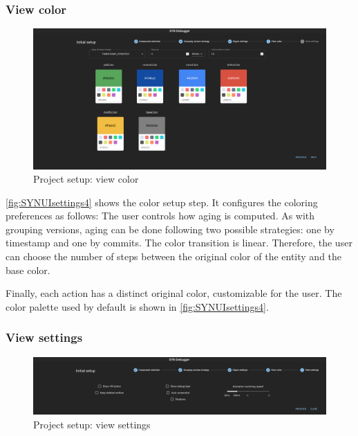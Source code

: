 \subsubsection*{View color}

\begin{figure}[h]
    \center
    \includegraphics[width=\textwidth]{SYNUI-settings4.png}
    \caption{Project setup: view color}
    \label{fig:SYNUIsettings4}
\end{figure}

\autoref{fig:SYNUIsettings4} shows the color setup step. It configures the coloring preferences as follows:
The user controls how aging is computed. 
As with grouping versions, aging can be done following two possible strategies: one by timestamp and one by commits. 
The color transition is linear. Therefore, the user can choose the number of steps between the original color of the entity and the base color. 

Finally, each action has a distinct original color, customizable for the user. The color palette used by default is shown in \autoref{fig:SYNUIsettings4}.



\subsubsection*{View settings}

\begin{figure}[h]
    \center
    \includegraphics[width=\textwidth]{SYNUI-settings5.png}
    \caption{Project setup: view settings}
    \label{fig:SYNUIsettings5}
\end{figure}

